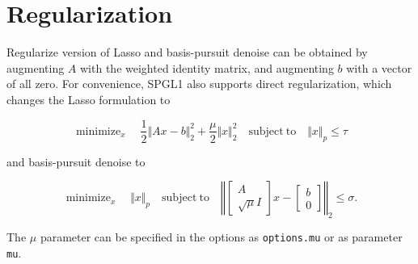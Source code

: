 \documentclass[
]{article}
\author{}
\date{}
\begin{document}
\hypertarget{regularization}{%
\section{Regularization}\label{regularization}}

Regularize version of Lasso and basis-pursuit denoise can be obtained by
augmenting \(A\) with the weighted identity matrix, and augmenting \(b\)
with a vector of all zero. For convenience, SPGL1 also supports direct
regularization, which changes the Lasso formulation to

\[\mathop{\mathrm{minimize}}_{x}\quad {\textstyle\frac{1}{2}}\Vert Ax-b\Vert_2^2 + {\textstyle\frac{\mu}{2}}\Vert x\Vert_2^2\quad\mathrm{subject\ to}\quad \Vert x\Vert_p \leq \tau\]

and basis-pursuit denoise to

\[\mathop{\mathrm{minimize}}_{x}\quad \Vert x\Vert_p\quad \mathrm{subject\ to}\quad \left\Vert \left[\begin{array}{c}A\\ \sqrt{\mu}I\end{array}\right]x-\left[\begin{array}{c}b\\0\end{array}\right]\right\Vert_2\leq \sigma.\]

The \(\mu\) parameter can be specified in the options as
\texttt{options.mu} or as parameter \texttt{mu}.
\end{document}

